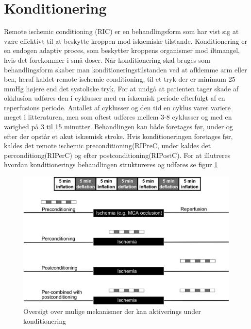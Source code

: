 \section{Konditionering}
Remote ischemic conditioning (RIC) er en behandlingsform som har vist sig at være effektivt til at beskytte kroppen mod iskæmiske tilstande. Konditionering er en endogen adaptiv proces, som beskytter kroppens organismer mod iltmangel, hvis det forekommer i små doser. Når konditionering skal bruges som behandlingsform skaber man konditioneringstilstanden ved at afklemme arm eller ben, heraf kaldet remote ischemic conditioning, til et tryk der er minimum 25 mmHg højere end det systoliske tryk. For at undgå at patienten tager skade af okklusion udføres den i cyklusser med en iskæmisk periode efterfulgt af en reperfusions periode. Antallet af cyklusser og den tid en cyklus varer variere meget i litteraturen, men som oftest udføres mellem 3-8 cyklusser og med en varighed på 3 til 15 minutter. 
Behandlingen kan både foretages før, under og efter der opstår et akut iskæmisk stroke. Hvis konditioneringen foretages før, kaldes det remote ischemic preconditioning(RIPreC, under kaldes det perconditiong(RIPerC) og efter postconditioning(RIPostC). For at illutreres hvordan konditionerings behandlingen struktureres og udføres se figur \ref{fig:cycles}

\begin{figure}[H]
	\includegraphics[width = \textwidth]{billeder/PrePerPostKonditionering.png}
	\caption{Oversigt over mulige mekanismer der kan aktiverings under konditionering}\label{fig:cycles}
\end{figure}

